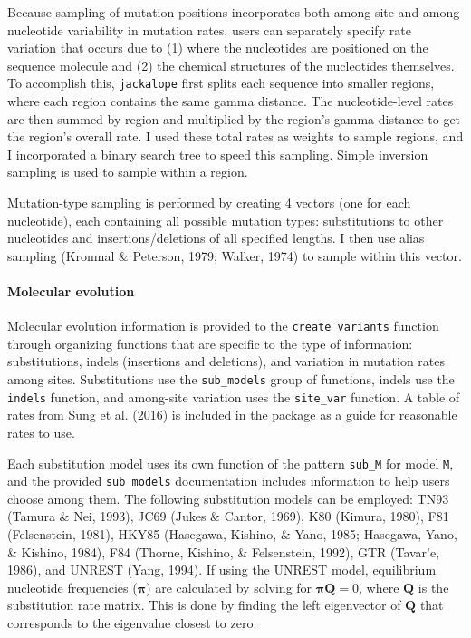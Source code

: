 \documentclass[12pt,]{article}
\let\oldparagraph\paragraph
\renewcommand{\paragraph}[1]{\oldparagraph{#1}\mbox{}}
\begin{document}
Because sampling of mutation positions incorporates both among-site and among-nucleotide
variability in mutation rates,
users can separately specify rate variation that occurs due to
(1) where the nucleotides are positioned on the sequence molecule and
(2) the chemical structures of the nucleotides themselves.
To accomplish this, \texttt{jackalope} first splits each sequence into
smaller regions, where each region contains the same gamma distance.
The nucleotide-level rates are then summed by region and multiplied by the region's
gamma distance to get the region's overall rate.
I used these total rates as weights to sample regions, and
I incorporated a binary search tree to speed this sampling.
Simple inversion sampling is used to sample within a region.

Mutation-type sampling is performed by creating 4 vectors (one for each nucleotide),
each containing all possible mutation types:
substitutions to other nucleotides and insertions/deletions of all specified lengths.
I then use alias sampling
(Kronmal \& Peterson, 1979; Walker, 1974)
to sample within this vector.

\hypertarget{molecular-evolution}{%
\paragraph{Molecular evolution}\label{molecular-evolution}}

Molecular evolution information is provided to the \texttt{create\_variants}
function through organizing functions that are specific to the type of information:
substitutions, indels (insertions and deletions),
and variation in mutation rates among sites.
Substitutions use the \texttt{sub\_models} group of functions,
indels use the \texttt{indels} function,
and among-site variation uses the \texttt{site\_var} function.
A table of rates from Sung et al. (2016) is included in the package
as a guide for reasonable rates to use.

Each substitution model uses its own function of the pattern \texttt{sub\_M} for model \texttt{M},
and the provided \texttt{sub\_models} documentation includes information to help
users choose among them.
The following substitution models can be employed:
TN93 (Tamura \& Nei, 1993),
JC69 (Jukes \& Cantor, 1969),
K80 (Kimura, 1980),
F81 (Felsenstein, 1981),
HKY85 (Hasegawa, Kishino, \& Yano, 1985; Hasegawa, Yano, \& Kishino, 1984),
F84 (Thorne, Kishino, \& Felsenstein, 1992),
GTR (Tavar\a'e, 1986),
and UNREST (Yang, 1994).
If using the UNREST model, equilibrium nucleotide frequencies (\(\mathbf{\pi}\)) are
calculated by solving for \(\mathbf{\pi} \mathbf{Q} = 0\), where \(\mathbf{Q}\) is the
substitution rate matrix.
This is done by finding the left eigenvector of \(\mathbf{Q}\) that
corresponds to the eigenvalue closest to zero.
\end{document}
